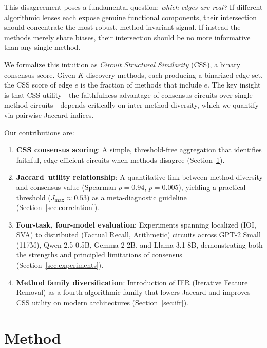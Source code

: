 \documentclass[11pt,a4paper]{article}
\newcommand{\css}{\textsc{CSS}}
\begin{document}
This disagreement poses a fundamental question: \emph{which edges are real?}
If different algorithmic lenses each expose genuine functional components, their intersection should concentrate the most robust, method-invariant signal.
If instead the methods merely share biases, their intersection should be no more informative than any single method.

We formalize this intuition as \emph{Circuit Structural Similarity} (\css{}), a binary consensus score.
Given $K$ discovery methods, each producing a binarized edge set, the \css{} score of edge $e$ is the fraction of methods that include $e$.
The key insight is that \css{} utility---the faithfulness advantage of consensus circuits over single-method circuits---depends critically on inter-method diversity, which we quantify via pairwise Jaccard indices.

Our contributions are:
\begin{enumerate}
    \item \textbf{\css{} consensus scoring}: A simple, threshold-free aggregation that identifies faithful, edge-efficient circuits when methods disagree (Section~\ref{sec:method}).
    \item \textbf{Jaccard--utility relationship}: A quantitative link between method diversity and consensus value (Spearman $\rho\!=\!0.94$, $p\!=\!0.005$), yielding a practical threshold ($J_{\max}\!\approx\!0.53$) as a meta-diagnostic guideline (Section~\ref{sec:correlation}).
    \item \textbf{Four-task, four-model evaluation}: Experiments spanning localized (IOI, SVA) to distributed (Factual Recall, Arithmetic) circuits across GPT-2 Small (117M), Qwen-2.5 0.5B, Gemma-2 2B, and Llama-3.1 8B, demonstrating both the strengths and principled limitations of consensus (Section~\ref{sec:experiments}).
    \item \textbf{Method family diversification}: Introduction of IFR (Iterative Feature Removal) as a fourth algorithmic family that lowers Jaccard and improves \css{} utility on modern architectures (Section~\ref{sec:ifr}).
\end{enumerate}

\section{Method}
\label{sec:method}
\end{document}
